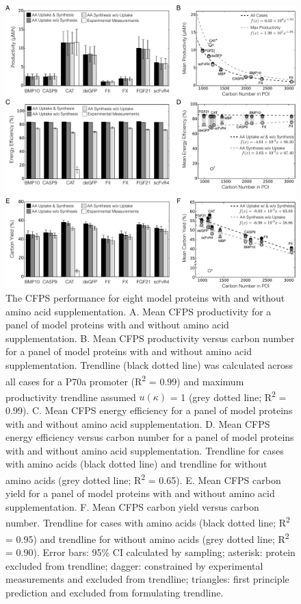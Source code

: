 \documentclass[journal=asbcd6,manuscript=article]{achemso}
\begin{document}
\begin{figure}[t!]
\centering
\includegraphics[width=1.00\textwidth]{./figs/Fig-2-Performance.pdf}
\caption{The CFPS performance for eight model proteins with and without amino acid supplementation.
A. Mean CFPS productivity for a panel of model proteins with and without amino acid supplementation.
B. Mean CFPS productivity versus carbon number for a panel of model proteins with and without amino acid supplementation.
Trendline (black dotted line) was calculated across all cases for a P70a promoter (R\textsuperscript{2} = 0.99) and maximum productivity trendline assumed $u\left(\kappa\right)$ = 1 (grey dotted line; R\textsuperscript{2} = 0.99).
C. Mean CFPS energy efficiency for a panel of model proteins with and without amino acid supplementation.
D. Mean CFPS energy efficiency versus carbon number for a panel of model proteins with and without amino acid supplementation.
Trendline for cases with amino acids (black dotted line) and trendline for without amino acids (grey dotted line; R\textsuperscript{2} = 0.65).
E. Mean CFPS carbon yield for a panel of model proteins with and without amino acid supplementation.
F. Mean CFPS carbon yield versus carbon number.
Trendline for cases with amino acids (black dotted line; R\textsuperscript{2} = 0.95) and trendline for without amino acids (grey dotted line; R\textsuperscript{2} = 0.90).
Error bars: 95\% CI calculated by sampling;
asterisk: protein excluded from trendline;
dagger: constrained by experimental measurements and excluded from trendline;
triangles: first principle prediction and excluded from formulating trendline.}
\label{fig:Prof}
\end{figure}
\end{document}
